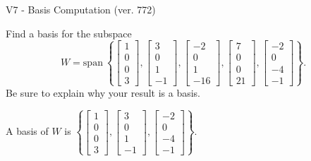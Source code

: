 \begin{exercise}
  \begin{exerciseTitle}V7 - Basis Computation (ver. 772)\end{exerciseTitle}
  \begin{exerciseStatement}
    Find a basis for the subspace 
\[W=\mathrm{span}\ \left\{\left[\begin{array}{r}
1 \\
0 \\
0 \\
3
\end{array}\right] , \left[\begin{array}{r}
3 \\
0 \\
1 \\
-1
\end{array}\right] , \left[\begin{array}{r}
-2 \\
0 \\
1 \\
-16
\end{array}\right] , \left[\begin{array}{r}
7 \\
0 \\
0 \\
21
\end{array}\right] , \left[\begin{array}{r}
-2 \\
0 \\
-4 \\
-1
\end{array}\right]\right\}.\]
 Be sure to explain why your result is a basis.


  \end{exerciseStatement}
  \begin{exerciseAnswer}
   A basis of \(W\) is  \(\left\{\left[\begin{array}{r}
1 \\
0 \\
0 \\
3
\end{array}\right] , \left[\begin{array}{r}
3 \\
0 \\
1 \\
-1
\end{array}\right] , \left[\begin{array}{r}
-2 \\
0 \\
-4 \\
-1
\end{array}\right]\right\}\).
  


  \end{exerciseAnswer}
\end{exercise}